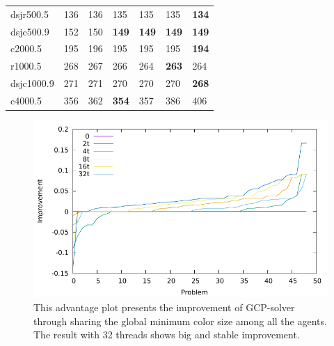 \documentclass[12pt,a4paper,twoside]{scrartcl}
\numberwithin{equation}{section}
\begin{document}
\begin{table}
\begin{center}
\begin{tabular}{| l | l | l|l|l|l|p{1cm}|}
dsjr500.5&136&136&135&135&135&\textbf{134}\\ 
dsjc500.9&152&150&\textbf{149}&\textbf{149}&\textbf{149}&\textbf{149}\\ \hline
c2000.5&195&196&195&195&195&\textbf{194}\\ 
r1000.5&268&267&266&264&\textbf{263}&264\\
dsjc1000.9&271&271&270&270&270&\textbf{268}\\ 
c4000.5&356&362&\textbf{354}&357&386&406\\ \hline
    \end{tabular}
\label{table:GCP-solverFCR}
\end{center}
\end{table}
\clearpage
\begin{figure}[h]
  \includegraphics[scale = 1]{Experiments/E6/imp/impro.pdf}
\caption{This advantage plot presents the improvement of GCP-solver through sharing the  global minimum color size among all the agents. The result with 32 threads shows  big and stable improvement.}
\end{figure}
\end{document}

